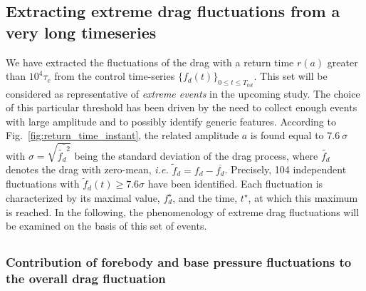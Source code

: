 \subsection{Extracting extreme drag fluctuations from a very long timeseries}
\label{sec:extreme_extraction}

%
We have extracted the fluctuations of the drag with a return time $r(a)$ greater than  $10^4\tau_c$ from the control time-series $\{f_d(t)\}_{0 \leq t \leq T_{tot}}$.
This set will be considered as representative of \emph{extreme events} in the upcoming study.
The choice of this particular threshold has been driven by the need to collect enough events with large amplitude and to possibly identify generic features.
%
According to Fig.~\ref{fig:return_time_instant}, the related amplitude $a$ is found equal to $7.6~\sigma$ with $\sigma =\sqrt{\overline{\tilde{f_d}^2}}$ being the standard deviation of the drag process, where $\tilde{f_d}$ denotes the drag with zero-mean, \textit{i.e.} $\tilde{f}_d = f_d - \overline{f_d}$.
Precisely, 104 independent fluctuations with $\tilde{f}_d(t) \geq 7.6\sigma$ have been identified. Each fluctuation is characterized by its maximal value, $f_d^{\star}$, and the time, $t^{\star}$, at which this maximum is reached.
%
In the following, the phenomenology of extreme drag fluctuations will be examined on the basis of this set of events.

\subsection{}
\label{sec:instantaneous_drag}

\subsubsection{Contribution of forebody and base pressure fluctuations to the overall drag fluctuation}
\label{sec:forebody_and_base_contribution}

